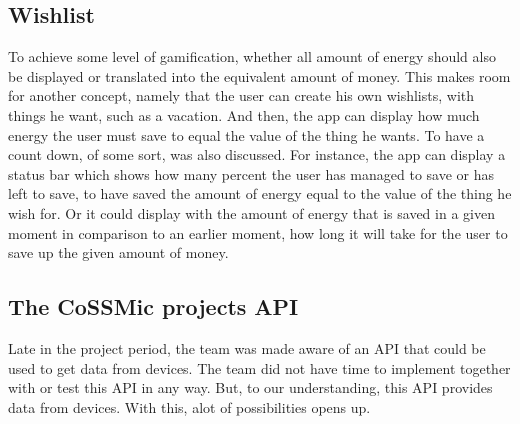 \subsection{Wishlist}
To achieve some level of gamification, whether all amount of energy should also be displayed or translated into the equivalent amount of money. This makes room for another concept, namely that the user can create his own wishlists, with things he want, such as a vacation. And then, the app can display how much energy the user must save to equal the value of the thing he wants. To have a count down, of some sort, was also discussed. For instance, the app can display a status bar which shows how many percent the user has managed to save or has left to save, to have saved the amount of energy equal to the value of the thing he wish for. Or it could display with the amount of energy that is saved in a given moment in comparison to an earlier moment, how long it will take for the user to save up the given amount of money.  

\subsection{The CoSSMic projects API}
\label{sec:cossmicapi}
Late in the project period, the team was made aware of an API that could be used to get data from devices. The team did not have time to implement together with or test this API in any way. But, to our understanding, this API provides data from devices. With this, alot of possibilities opens up. 

